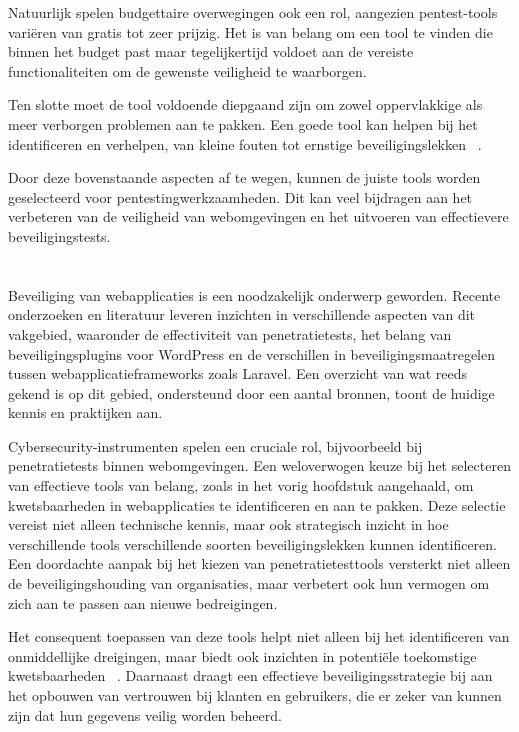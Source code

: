 Natuurlijk spelen budgettaire overwegingen ook een rol, aangezien pentest-tools variëren van gratis tot zeer prijzig. Het 
is van belang om een tool te vinden die binnen het budget past maar tegelijkertijd voldoet aan de vereiste functionaliteiten
om de gewenste veiligheid te waarborgen.

Ten slotte moet de tool voldoende diepgaand zijn om zowel oppervlakkige als meer verborgen problemen aan te pakken. 
Een goede tool kan helpen bij het identificeren en verhelpen, van kleine fouten tot ernstige beveiligingslekken
~\autocite{Maji2022}.

Door deze bovenstaande aspecten af te wegen, kunnen de juiste tools worden geselecteerd voor pentestingwerkzaamheden. 
Dit kan veel bijdragen aan het verbeteren van de veiligheid van webomgevingen en het uitvoeren van effectievere beveiligingstests.

\section{}
\label{sec:wat-weten-we-uit-de-literatuur}
Beveiliging van webapplicaties is een noodzakelijk onderwerp geworden. Recente onderzoeken en literatuur leveren 
inzichten in verschillende aspecten van dit vakgebied, waaronder de effectiviteit van penetratietests, het belang van beveiligingsplugins voor WordPress en de verschillen 
in beveiligingsmaatregelen tussen webapplicatieframeworks zoals Laravel. Een overzicht van wat reeds gekend is op dit gebied, ondersteund door een aantal 
bronnen, toont de huidige kennis en praktijken aan.

Cybersecurity-instrumenten spelen een cruciale rol, bijvoorbeeld bij penetratietests binnen webomgevingen. Een weloverwogen keuze bij het
selecteren van effectieve tools van belang, zoals in het vorig hoofdstuk aangehaald, om kwetsbaarheden in webapplicaties te identificeren en aan te pakken. 
Deze selectie vereist niet alleen technische kennis, maar ook strategisch inzicht in hoe verschillende tools verschillende 
soorten beveiligingslekken kunnen identificeren.
Een doordachte aanpak bij het kiezen van penetratietesttools versterkt niet alleen de beveiligingshouding 
van organisaties, maar verbetert ook hun vermogen om zich aan te passen aan nieuwe bedreigingen. 

Het consequent toepassen van deze tools helpt niet alleen bij het identificeren van onmiddellijke dreigingen, maar 
biedt ook inzichten in potentiële toekomstige kwetsbaarheden ~\autocite{Albahar2022}.
Daarnaast draagt een effectieve beveiligingsstrategie bij aan het opbouwen van vertrouwen bij klanten en gebruikers, die er 
zeker van kunnen zijn dat hun gegevens veilig worden beheerd. 

